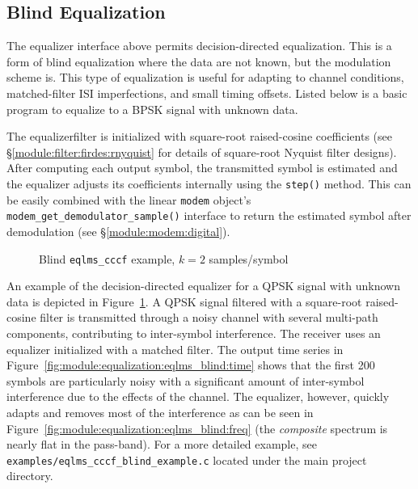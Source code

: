 \subsection{Blind Equalization}
\label{module:equalization:blind}
%
The equalizer interface above permits decision-directed equalization.
This is a form of blind equalization where the data are not known,
but the modulation scheme is.
This type of equalization is useful for adapting to channel conditions,
matched-filter ISI imperfections,
and small timing offsets.
Listed below is a basic program to equalize to a BPSK signal with
unknown data.
%

%
The equalizerfilter is initialized with square-root raised-cosine
coefficients
(see \S\ref{module:filter:firdes:rnyquist} for details of square-root
Nyquist filter designs).
After computing each output symbol,
the transmitted symbol is estimated and
the equalizer adjusts its coefficients internally using the
{\tt step()} method.
This can be easily combined with the linear {\tt modem} object's
{\tt modem\_get\_demodulator\_sample()}
interface to return the estimated symbol after demodulation
(see \S\ref{module:modem:digital}).

\begin{figure}
\centering
{}

\caption{Blind {\tt eqlms\_cccf} example, $k=2$ samples/symbol}
\label{fig:module:equalization:eqlms_blind}
\end{figure}
%
An example of the decision-directed equalizer for a QPSK signal with
unknown data is depicted in
Figure~\ref{fig:module:equalization:eqlms_blind}.
A QPSK signal filtered with a square-root raised-cosine filter is
transmitted through a noisy channel with several multi-path components,
contributing to inter-symbol interference.
The receiver uses an equalizer initialized with a matched filter.
The output time series in
Figure~\ref{fig:module:equalization:eqlms_blind:time}
shows that the first 200 symbols are particularly noisy with a
significant amount of inter-symbol interference due to the effects of
the channel.
The equalizer, however, quickly adapts and removes most of the
interference as can be seen in
Figure~\ref{fig:module:equalization:eqlms_blind:freq}
(the {\em composite} spectrum is nearly flat in the pass-band).
%
For a more detailed example, see
{\tt examples/eqlms\_cccf\_blind\_example.c}
located under the main project directory.

